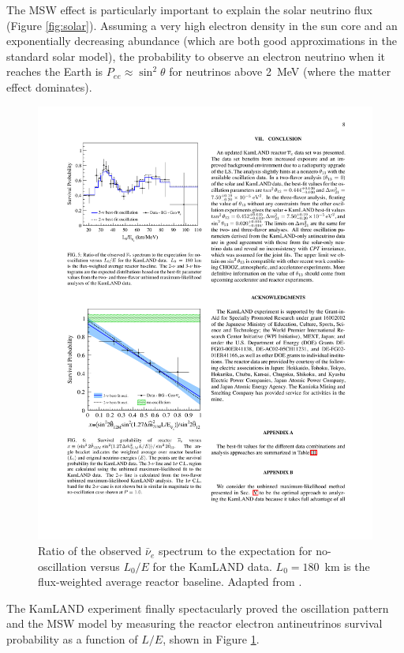 The MSW effect is particularly important to explain the solar neutrino flux (Figure \ref{fig:solar}). Assuming a very high electron density in the sun core and an exponentially decreasing abundance (which are both good approximations in the standard solar model), the probability to observe an electron neutrino when it reaches the Earth is $P_{ee} \approx \sin^2\theta$ for neutrinos above 2~MeV (where the matter effect dominates).



\begin{figure}[htbp]
    \centering
    \includegraphics[width=0.75\linewidth]{figures/kamland.pdf}
    \caption{Ratio of the observed $\bar{\nu}_{e}$ spectrum to the expectation for no-oscillation versus $L_{0}/E$ for the KamLAND data. $L_{0} = 180$~km is the flux-weighted average reactor baseline. Adapted from \cite{Gando:2010aa}.}
    \label{fig:kamland}
\end{figure}

The KamLAND experiment finally spectacularly proved the oscillation pattern and the MSW model by measuring the reactor electron antineutrinos survival probability as a function of $L/E$, shown in Figure \ref{fig:kamland}. 

